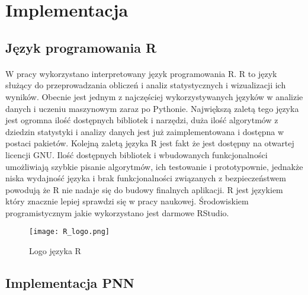 \documentclass[a4paper,12pt,twoside]{article}
\begin{document}
\newpage
\section{Implementacja}

\subsection{Język programowania R}
\paragraph{}
W pracy  wykorzystano interpretowany język programowania R. R to język służący do przeprowadzania obliczeń i analiz statystycznych i wizualizacji ich wyników. Obecnie jest jednym z najczęściej wykorzystywanych języków w analizie danych i uczeniu maszynowym zaraz po Pythonie. Największą zaletą tego języka jest ogromna ilość dostępnych bibliotek i narzędzi, duża ilość algorytmów z dziedzin statystyki i analizy danych jest już zaimplementowana i dostępna w postaci pakietów. Kolejną zaletą języka R jest fakt że jest dostępny na otwartej licencji GNU. Ilość dostępnych bibliotek i wbudowanych funkcjonalności umożliwiają szybkie pisanie algorytmów, ich testowanie i prototypownie, jednakże niska wydajność języka i brak funkcjonalności związanych z bezpieczeństwem powodują że R nie nadaje się do budowy finalnych aplikacji. R jest językiem który znacznie lepiej sprawdzi się w pracy naukowej. Środowiskiem programistycznym jakie wykorzystano jest darmowe RStudio.
\begin{figure}[h]
    \centering
    \texttt{[image: R\_logo.png]}
    \caption{Logo języka R}
\end{figure}
 \newpage
\subsection{Implementacja PNN}
\end{document}
